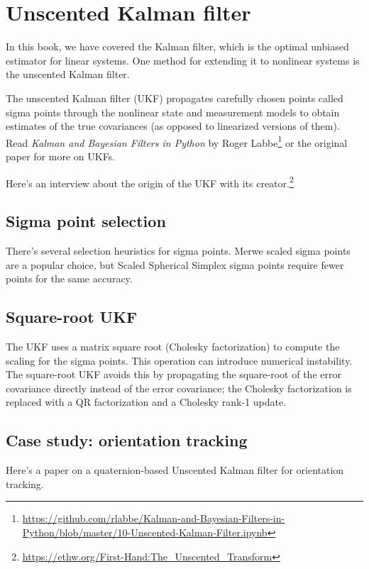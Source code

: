 \section{Unscented Kalman filter}
\label{sec:ukf}

In this book, we have covered the Kalman filter, which is the optimal unbiased
estimator for linear \glspl{system}. One method for extending it to nonlinear
systems is the unscented Kalman filter.

The unscented Kalman filter (UKF) propagates carefully chosen points called
sigma points through the nonlinear state and measurement models to obtain
estimates of the true covariances (as opposed to linearized versions of them).
Read \textit{Kalman and Bayesian Filters in Python} by Roger
Labbe\footnote{\url{https://github.com/rlabbe/Kalman-and-Bayesian-Filters-in-Python/blob/master/10-Unscented-Kalman-Filter.ipynb}} or the original paper for more on UKFs.

Here's an interview about the origin of the UKF with its
creator.\footnote{\url{https://ethw.org/First-Hand:The_Unscented_Transform}}

\subsection{Sigma point selection}

There's several selection heuristics for sigma points. Merwe scaled sigma
points are a popular choice,
but Scaled Spherical Simplex sigma points
require fewer points for the same accuracy.

\subsection{Square-root UKF}

The UKF uses a matrix square root (Cholesky factorization) to compute the
scaling for the sigma points. This operation can introduce numerical
instability. The square-root UKF avoids this
by propagating the square-root of the error covariance directly instead of the
error covariance; the Cholesky factorization is replaced with a QR factorization
and a Cholesky rank-1 update.

\subsection{Case study: orientation tracking}

Here's a paper on a quaternion-based Unscented Kalman filter for orientation
tracking.
